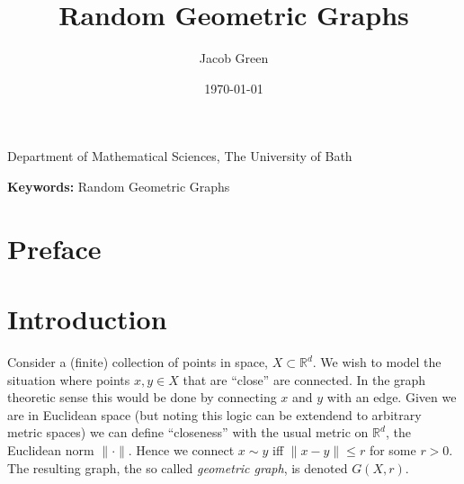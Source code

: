 \documentclass{article}
\title{Random Geometric Graphs}
\author{Jacob Green}
\date{\today}
\newcommand{\subtitle}{}
\newcommand{\institution}{Department of Mathematical Sciences, The University of Bath}
\newcommand{\keywords}{Random Geometric Graphs}
\newcounter{statementcount}
\begin{document}
\begin{titlepage}
    \centering
    
    {\Huge \bfseries \thetitle \par}
    \vspace{0.5cm}
    
    {\Large \subtitle \par}
    \vspace{1cm}
    
    {\large \theauthor \par}
    {\institution \par}
    \vspace{1cm}
    
    {\large \thedate \par}
    \vspace{1.5cm}
    
    \begin{abstract}
        \lipsum[10]
    \end{abstract}
    \vspace{1cm}
    
    \textbf{Keywords:} \keywords
    \vfill %
    
    \textit{}
\end{titlepage}

\newpage 

\setcounter{page}{1} %

\section*{Preface}

\tableofcontents

\newpage

\section{Introduction}

\setcounter{statementcount}{1}

Consider a (finite) collection of points in space, $X \subset \mathbb{R}^d$. We wish to model the situation 
where points $x, y \in X$ that are ``close'' are connected. In the graph theoretic sense this would be done by 
connecting $x$ and $y$ with an edge. Given we are in Euclidean space (but noting this logic can be extendend to 
arbitrary metric spaces) we can define ``closeness'' with the usual metric on $\mathbb{R}^d$, the Euclidean norm 
$\lVert \cdot \rVert$. Hence we connect $x \sim y$ iff $\lVert x - y \rVert \leq r$ for some $r > 0$. The resulting 
graph, the so called {\it geometric graph}, is denoted $G(X, r)$. \\ 
\end{document}
